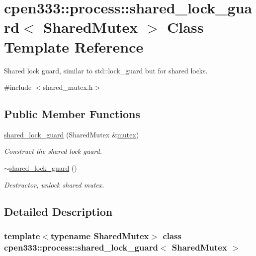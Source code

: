 \hypertarget{classcpen333_1_1process_1_1shared__lock__guard}{}\section{cpen333\+:\+:process\+:\+:shared\+\_\+lock\+\_\+guard$<$ Shared\+Mutex $>$ Class Template Reference}
\label{classcpen333_1_1process_1_1shared__lock__guard}


Shared lock guard, similar to std\+::lock\+\_\+guard but for shared locks.  




{\ttfamily \#include $<$shared\+\_\+mutex.\+h$>$}

\subsection*{Public Member Functions}
\begin{DoxyCompactItemize}
\item 
\hyperlink{classcpen333_1_1process_1_1shared__lock__guard_a263fb59ac82aea8a400239ec7c238a14}{shared\+\_\+lock\+\_\+guard} (Shared\+Mutex \&\hyperlink{classcpen333_1_1process_1_1mutex}{mutex})
\begin{DoxyCompactList}\small\item\em Construct the shared lock guard. \end{DoxyCompactList}\item 
\mbox{\label{classcpen333_1_1process_1_1shared__lock__guard_a1099368d682a5cc3e2dbf553ec0e0dad}} 
\hyperlink{classcpen333_1_1process_1_1shared__lock__guard_a1099368d682a5cc3e2dbf553ec0e0dad}{$\sim$shared\+\_\+lock\+\_\+guard} ()
\begin{DoxyCompactList}\small\item\em Destructor, unlock shared mutex. \end{DoxyCompactList}\end{DoxyCompactItemize}


\subsection{Detailed Description}
\subsubsection*{template$<$typename Shared\+Mutex$>$\newline
class cpen333\+::process\+::shared\+\_\+lock\+\_\+guard$<$ Shared\+Mutex $>$}

